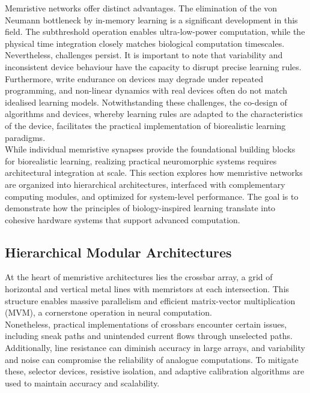 \noindent Memristive networks offer distinct advantages. The elimination of the von Neumann bottleneck by in-memory learning is a significant development in this field. The subthreshold operation enables ultra-low-power computation, while the physical time integration closely matches biological computation timescales. \\

\noindent Nevertheless, challenges persist. It is important to note that variability and inconsistent device behaviour have the capacity to disrupt precise learning rules. Furthermore, write endurance on devices may degrade under repeated programming, and non-linear dynamics with real devices often do not match idealised learning models. Notwithstanding these challenges, the co-design of algorithms and devices, whereby learning rules are adapted to the characteristics of the device, facilitates the practical implementation of biorealistic learning paradigms.\\

\noindent While individual memristive synapses provide the foundational building blocks for biorealistic learning, realizing practical neuromorphic systems requires architectural integration at scale. This section explores how memristive networks are organized into hierarchical architectures, interfaced with complementary computing modules, and optimized for system-level performance. The goal is to demonstrate how the principles of biology-inspired learning translate into cohesive hardware systems that support advanced computation.

\subsection[Hierarchical Modular Architectures]{Hierarchical Modular Architectures}

At the heart of memristive architectures lies the crossbar array, a grid of horizontal and vertical metal lines with memristors at each intersection. This structure enables massive parallelism and efficient matrix-vector multiplication (MVM), a cornerstone operation in neural computation. \\

\noindent Nonetheless, practical implementations of crossbars encounter certain issues, including sneak paths and unintended current flows through unselected paths. Additionally, line resistance can diminish accuracy in large arrays, and variability and noise can compromise the reliability of analogue computations. To mitigate these, selector devices, resistive isolation, and adaptive calibration algorithms are used to maintain accuracy and scalability.\\

